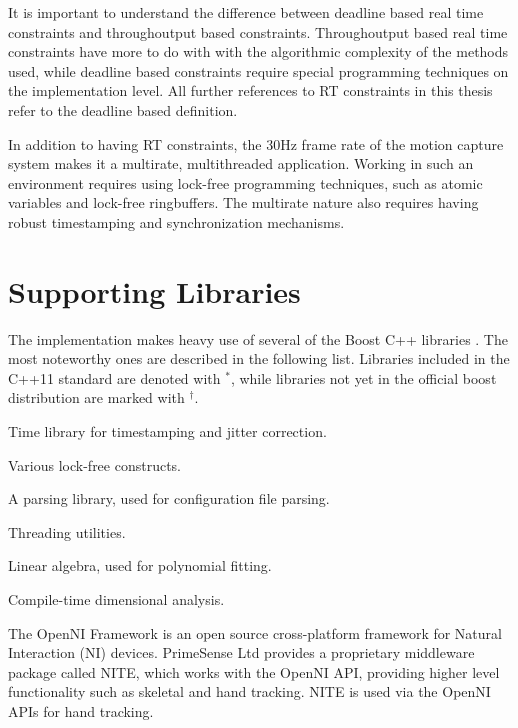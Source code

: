 It is important to understand the difference between
deadline based real time constraints
and throughoutput based constraints.
Throughoutput based real time constraints have
more to do with with the algorithmic complexity
of the methods used,
while deadline based constraints
require special programming techniques on the implementation level.
All further references to RT constraints in this thesis
refer to the deadline based definition.

In addition to having RT constraints,
the 30Hz frame rate of the motion capture system
makes it a multirate, multithreaded application.
Working in such an environment requires using
lock-free programming techniques,
such as atomic variables and lock-free ringbuffers.
The multirate nature also requires having robust timestamping and synchronization mechanisms.


\section{Supporting Libraries}
\label{sec:supporting_libraries}

The implementation makes heavy use of several of the Boost C++ libraries \cite{boost}.
The most noteworthy ones are described in the following list.
Libraries included in the C++11 standard \cite{cpp11}
are denoted with $^*$,
while libraries not yet in the official boost distribution
are marked with $^\dagger$.
\begin{description}[leftmargin=14ex]
\item[Chrono$^*$] Time library for timestamping and jitter correction.
\item[Geometry] 
\item[Lockfree$^\dagger$] Various lock-free constructs.
\item[Spirit] A parsing library, used for configuration file parsing.
\item[Thread$^*$] Threading utilities.
\item[uBLAS] Linear algebra, used for polynomial fitting.
\item[Units] Compile-time dimensional analysis.
\end{description}

The OpenNI Framework \cite{openni} is an open source cross-platform
framework for Natural Interaction (NI) devices.
PrimeSense Ltd \cite{primesense} provides a proprietary
middleware package called NITE,
which works with the OpenNI API,
providing higher level functionality such as skeletal and hand tracking.
NITE is used via the OpenNI APIs for hand tracking.

